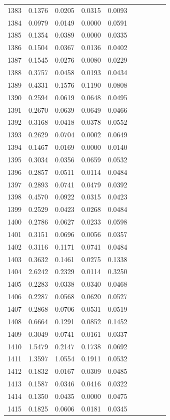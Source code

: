 \begin{table}
\begin{tabular}{cccccccccc}
1383& 0.1376& 0.0205& 0.0315& 0.0093\\ 
1384& 0.0979& 0.0149& 0.0000& 0.0591\\ 
1385& 0.1354& 0.0389& 0.0000& 0.0335\\ 
1386& 0.1504& 0.0367& 0.0136& 0.0402\\ 
1387& 0.1545& 0.0276& 0.0080& 0.0229\\ 
1388& 0.3757& 0.0458& 0.0193& 0.0434\\ 
1389& 0.4331& 0.1576& 0.1190& 0.0808\\ 
1390& 0.2594& 0.0619& 0.0648& 0.0495\\ 
1391& 0.2670& 0.0639& 0.0649& 0.0466\\ 
1392& 0.3168& 0.0418& 0.0378& 0.0552\\ 
1393& 0.2629& 0.0704& 0.0002& 0.0649\\ 
1394& 0.1467& 0.0169& 0.0000& 0.0140\\ 
1395& 0.3034& 0.0356& 0.0659& 0.0532\\ 
1396& 0.2857& 0.0511& 0.0114& 0.0484\\ 
1397& 0.2893& 0.0741& 0.0479& 0.0392\\ 
1398& 0.4570& 0.0922& 0.0315& 0.0423\\ 
1399& 0.2529& 0.0423& 0.0268& 0.0484\\ 
1400& 0.2786& 0.0627& 0.0233& 0.0598\\ 
1401& 0.3151& 0.0696& 0.0056& 0.0357\\ 
1402& 0.3116& 0.1171& 0.0741& 0.0484\\ 
1403& 0.3632& 0.1461& 0.0275& 0.1338\\ 
1404& 2.6242& 0.2329& 0.0114& 0.3250\\ 
1405& 0.2283& 0.0338& 0.0340& 0.0468\\ 
1406& 0.2287& 0.0568& 0.0620& 0.0527\\ 
1407& 0.2868& 0.0706& 0.0531& 0.0519\\ 
1408& 0.6664& 0.1291& 0.0852& 0.1452\\ 
1409& 0.3049& 0.0741& 0.0161& 0.0337\\ 
1410& 1.5479& 0.2147& 0.1738& 0.0692\\ 
1411& 1.3597& 1.0554& 0.1911& 0.0532\\ 
1412& 0.1832& 0.0167& 0.0309& 0.0485\\ 
1413& 0.1587& 0.0346& 0.0416& 0.0322\\ 
1414& 0.1350& 0.0435& 0.0000& 0.0475\\ 
1415& 0.1825& 0.0606& 0.0181& 0.0345\\ 

\end{tabular}
\end{table}

